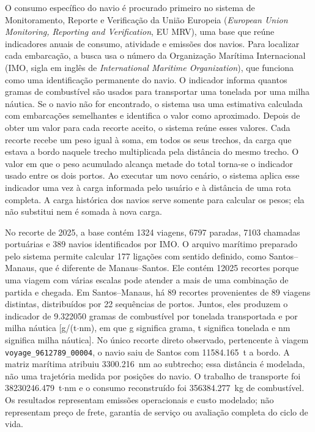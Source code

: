 \documentclass[12pt,a4paper]{report}
\begin{document}
O consumo específico do navio é procurado primeiro no sistema de Monitoramento, Reporte e Verificação da União Europeia (\emph{European Union Monitoring, Reporting and Verification}, EU MRV), uma base que reúne indicadores anuais de consumo, atividade e emissões dos navios. Para localizar cada embarcação, a busca usa o número da Organização Marítima Internacional (IMO, sigla em inglês de \emph{International Maritime Organization}), que funciona como uma identificação permanente do navio. O indicador informa quantos gramas de combustível são usados para transportar uma tonelada por uma milha náutica. Se o navio não for encontrado, o sistema usa uma estimativa calculada com embarcações semelhantes e identifica o valor como aproximado. Depois de obter um valor para cada recorte aceito, o sistema reúne esses valores. Cada recorte recebe um peso igual à soma, em todos os seus trechos, da carga que estava a bordo naquele trecho multiplicada pela distância do mesmo trecho. O valor em que o peso acumulado alcança metade do total torna-se o indicador usado entre os dois portos. Ao executar um novo cenário, o sistema aplica esse indicador uma vez à carga informada pelo usuário e à distância de uma rota completa. A carga histórica dos navios serve somente para calcular os pesos; ela não substitui nem é somada à nova carga.

No recorte de 2025, a base contém \num{1324} viagens, \num{6797} paradas, \num{7103} chamadas portuárias e \num{389} navios identificados por IMO. O arquivo marítimo preparado pelo sistema permite calcular \num{177} ligações com sentido definido, como Santos--Manaus, que é diferente de Manaus--Santos. Ele contém \num{12025} recortes porque uma viagem com várias escalas pode atender a mais de uma combinação de partida e chegada. Em Santos--Manaus, há \num{89} recortes provenientes de \num{89} viagens distintas, distribuídos por \num{22} sequências de portos. Juntos, eles produzem o indicador de \num{9.322050} gramas de combustível por tonelada transportada e por milha náutica [g/(t$\cdot$nm), em que g significa grama, t significa tonelada e nm significa milha náutica]. No único recorte direto observado, pertencente à viagem \texttt{voyage\_9612789\_00004}, o navio saiu de Santos com \num{11584.165}~t a bordo. A matriz marítima atribuiu \num{3300.216}~nm ao subtrecho; essa distância é modelada, não uma trajetória medida por posições do navio. O trabalho de transporte foi \num{38230246.479}~t$\cdot$nm e o consumo reconstruído foi \num{356384.277}~kg de combustível. Os resultados representam emissões operacionais e custo modelado; não representam preço de frete, garantia de serviço ou avaliação completa do ciclo de vida.
\end{document}
